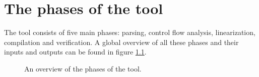 \chapter{The phases of the tool} \label{chap:phases}
The tool consists of five main phases: parsing, control flow analysis, 
linearization, compilation and verification. A global overview of all these phases
and their inputs and outputs can be found in figure \ref{fig:phases_overview}.

\begin{figure}[H]
    \caption{An overview of the phases of the tool.}
    \centering
    \label{fig:phases_overview}
\end{figure}
